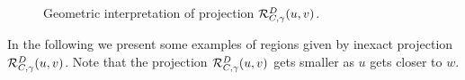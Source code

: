 \begin{figure}[H]
	\begin{subfigmatrix}{2}
	\end{subfigmatrix}
	\caption{Geometric interpretation of projection ${\cal R}_{C,\gamma}^{D}(u, v)$.}
	\label{fig:condProj1}
\end{figure}
In the following we present some examples of regions given by inexact projection ${\cal R}_{C,\gamma}^{D}(u, v)$. Note that the projection ${\cal R}_{C,\gamma}^{D}(u, v)$ gets smaller as $u$ gets closer to $w$.
